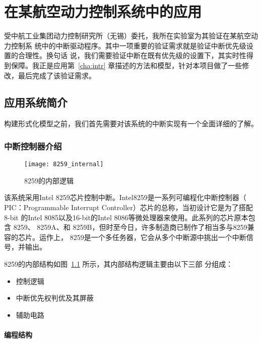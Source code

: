 
\chapter{在某航空动力控制系统中的应用}
\label{cha:case}

受中航工业集团动力控制研究所（无锡）委托，我所在实验室为其验证在某航空动力控制系
统中的中断驱动程序。其中一项重要的验证需求就是验证中断优先级设置的合理性。换句话
说，我们需要验证中断在既有优先级的设置下，其实时性得到保障。我正是应用第~\ref{cha:intr} 
章描述的方法和模型，针对本项目做了一些修改，最后完成了该验证需求。

\section{应用系统简介}
\label{sec:system_intro}

构建形式化模型之前，我们首先需要对该系统的中断实现有一个全面详细的了解。

\subsection{中断控制器介绍}
\label{subsec:8259}

\begin{figure}[H]
	\centering
	\texttt{[image: 8259\_internal]}
	\caption{8259的内部逻辑}
	\label{fig:8259_internal}
\end{figure}

该系统采用Intel 8259芯片控制中断。Intel8259是一系列可编程化中断控制器（
PIC：Programmable Interrupt Controller）芯片的总称，当初设计它是为了搭配 8-bit
的Intel 8085以及16-bit的Intel 8086等微处理器来使用。此系列的芯片原本包含 8259、
8259A、和 8259B，但时至今日，许多制造商已制作了相当多与8259兼容的芯片。运作上，
8259是一个多任务器，它会从多个中断源中挑出一个中断信号，并输出。

8259的内部结构如图~\ref{fig:8259_internal} 所示，其内部结构逻辑主要由以下三部
分组成：

\begin{itemize}
	\item 控制逻辑
	\item 中断优先权判优及其屏蔽
	\item 辅助电路
\end{itemize}

\subsubsection{编程结构}
\label{subsubsec:8259_program}

